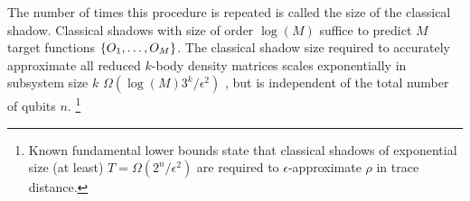 \documentclass[
aps,
pra,
twocolumn,
floatfix,
]{revtex4-2}
\theoremstyle{plain}
\newtheorem{theorem}{Theorem}
\newtheorem{lemma}{Lemma}
\theoremstyle{definition}
\newtheorem{definition}{Definition}
\newcommand{\ob}{O}
\newcommand{\dm}{\rho}
\newcommand{\shadow}{\textup{shadow}}
\newcommand{\U}{U}
\begin{document}
The number of times this procedure is repeated is called the size of the classical shadow. 
Classical shadows with size of order $\log(M)$ suffice to predict $M$ target functions $\qty{\ob_1,\dots,\ob_M}$.
The classical shadow size required to accurately approximate all reduced $k$-body density matrices scales exponentially in subsystem size $k$ $\Omega(\log(M) 3^k/\epsilon^2)$ \cite{huangPredictingManyProperties2020}, but is independent of the total number of qubits $n$.
\footnote{Known fundamental lower bounds state that classical shadows of exponential size (at least) $T = \Omega( 2^n / \epsilon^2)$ are required to $\epsilon$-approximate $\dm$ in trace distance.}
\end{document}
